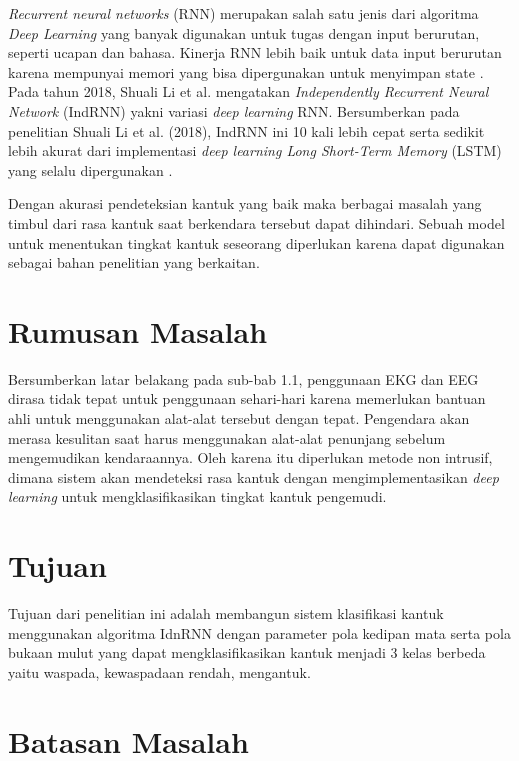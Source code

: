 \emph{Recurrent neural networks} (RNN) merupakan salah satu jenis
dari algoritma \emph{Deep Learning} yang banyak digunakan untuk tugas
dengan input berurutan, seperti ucapan dan bahasa. Kinerja RNN lebih baik
untuk data input berurutan karena mempunyai memori yang bisa
dipergunakan untuk menyimpan state \parencite{18}. Pada tahun 2018,
Shuali Li et al. mengatakan \emph{Independently Recurrent Neural Network}
(IndRNN) yakni variasi \emph{deep learning} RNN. Bersumberkan pada
penelitian Shuali Li et al. (2018), IndRNN ini 10 kali lebih cepat
serta sedikit lebih akurat dari implementasi \emph{deep learning Long Short-Term Memory}
(LSTM) yang selalu dipergunakan \parencite{8}.

Dengan akurasi pendeteksian kantuk yang baik maka berbagai masalah yang timbul dari 
rasa kantuk saat berkendara tersebut dapat dihindari. Sebuah model untuk menentukan 
tingkat kantuk seseorang diperlukan karena dapat digunakan sebagai bahan penelitian 
yang berkaitan.

\newpage
\section{Rumusan Masalah}
\label{sec:permasalahan}

Bersumberkan latar belakang pada sub-bab 1.1, penggunaan EKG dan
EEG dirasa tidak tepat untuk penggunaan sehari-hari karena memerlukan
bantuan ahli untuk menggunakan alat-alat tersebut dengan tepat.
Pengendara akan merasa kesulitan saat harus menggunakan alat-alat
penunjang sebelum mengemudikan kendaraannya. Oleh karena itu
diperlukan metode non intrusif, dimana sistem akan mendeteksi
rasa kantuk dengan mengimplementasikan \emph{deep learning} untuk
mengklasifikasikan tingkat kantuk pengemudi.

\section{Tujuan}
\label{sec:Tujuan}

Tujuan dari penelitian ini adalah membangun sistem klasifikasi
kantuk menggunakan algoritma IdnRNN dengan parameter pola kedipan
mata serta pola bukaan mulut yang dapat mengklasifikasikan kantuk
menjadi 3 kelas berbeda yaitu waspada, kewaspadaan rendah, mengantuk.

\section{Batasan Masalah}
\label{sec:batasanmasalah}

